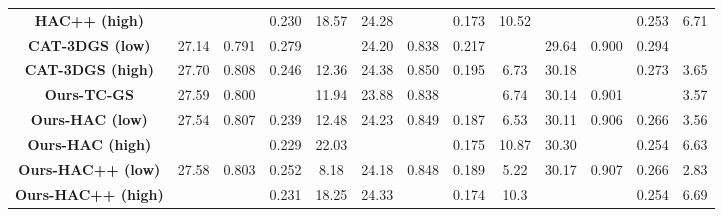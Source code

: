\begin{table}[]
{\begin{tabular}{c|cccc|cccc|cccc}
\textbf{HAC++ (high)} \cite{chen2025hac++}                                                               & \cellcolor[HTML]{FFEB9C}{27.80}     & \cellcolor[HTML]{FFEB9C}{0.811}    & 0.230     & 18.57    & 24.28      & \cellcolor[HTML]{FFEB9C}{0.856}      & 0.173     & 10.52     & \cellcolor[HTML]{FFC7CE}{30.34}     & \cellcolor[HTML]{FFEB9C}{0.910}     & 0.253    & 6.71      \\
\textbf{CAT-3DGS (low)} \cite{zhancat}                                                              & 27.14    & 0.791    & 0.279    & \cellcolor[HTML]{FFEB9C}{5.51}     & 24.20      & 0.838      & 0.217     & \cellcolor[HTML]{FFEB9C}{3.57}      & 29.64     & 0.900     & 0.294    & \cellcolor[HTML]{FFEB9C}{1.95}     \\
\textbf{CAT-3DGS (high)} \cite{zhancat}                                                            & 27.70    & 0.808    & 0.246    & 12.36    & 24.38      & 0.850      & 0.195     & 6.73      & 30.18     & \cellcolor[HTML]{FFEB9C}{0.910}     & 0.273    & 3.65     \\ \hline
\textbf{Ours-TC-GS} & 27.59    & 0.800    & \cellcolor[HTML]{FFEB9C}{0.167}    & 11.94    & 23.88      & 0.838      & \cellcolor[HTML]{FFEB9C}{0.117}     & 6.74      & 30.14     & 0.901    & \cellcolor[HTML]{FFC7CE}{0.119}    & 3.57     \\
\cellcolor[HTML]{FFFFFF}\textbf{Ours-HAC (low)}                                   & 27.54    & 0.807    & 0.239    & 12.48    & 24.23      & 0.849      & 0.187     & 6.53      & 30.11     & 0.906    & 0.266    & 3.56     \\
\cellcolor[HTML]{FFFFFF}\textbf{Ours-HAC (high)}                                  & \cellcolor[HTML]{FFC7CE}{27.86}    & \cellcolor[HTML]{FFEB9C}{0.811}    & 0.229    & 22.03    & \cellcolor[HTML]{FFC7CE}{24.52}      & \cellcolor[HTML]{FFC7CE}{0.857}      & 0.175     & 10.87     & 30.30     & \cellcolor[HTML]{FFC7CE}{0.911}    & 0.254    & 6.63     \\
\cellcolor[HTML]{FFFFFF}\textbf{Ours-HAC++ (low)}                                 & 27.58    & 0.803    & 0.252    & 8.18     & 24.18      & 0.848      & 0.189     & 5.22      & 30.17     & 0.907    & 0.266    & 2.83     \\
\cellcolor[HTML]{FFFFFF}\textbf{Ours-HAC++ (high)}                                & \cellcolor[HTML]{FFEB9C}{27.80}     & \cellcolor[HTML]{FFEB9C}{0.811}    & 0.231    & 18.25    & 24.33      & \cellcolor[HTML]{FFEB9C}{0.856}      & 0.174     & 10.3      & \cellcolor[HTML]{FFEB9C}{30.31}     & \cellcolor[HTML]{FFEB9C}{0.910}     & 0.254    & 6.69     \\

\end{tabular}}
\end{table}

